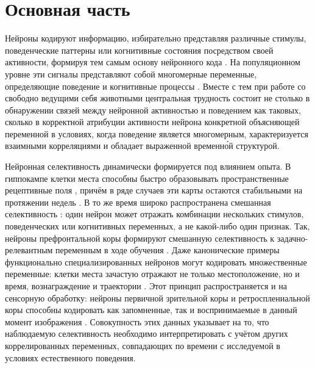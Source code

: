 \section{Основная часть}
\label{sec:main}

Нейроны кодируют информацию, избирательно представляя различные стимулы, поведенческие паттерны или когнитивные состояния посредством своей активности, формируя тем самым основу нейронного кода \cite{DayanAbbott2001}. На популяционном уровне эти сигналы представляют собой многомерные переменные, определяющие поведение и когнитивные процессы \cite{Averbeck2006}. Вместе с тем при работе со свободно ведущими себя животными центральная трудность состоит не столько в обнаружении связей между нейронной активностью и поведением как таковых, сколько в корректной атрибуции активности нейрона конкретной объясняющей переменной в условиях, когда поведение является многомерным, характеризуется взаимными корреляциями и обладает выраженной временн\'{о}й структурой.

Нейронная селективность динамически формируется под влиянием опыта. В гиппокампе клетки места способны быстро образовывать пространственные рецептивные поля \cite{Sotskov2022}, причём в ряде случаев эти карты остаются стабильными на протяжении недель \cite{Wilson1993, Thompson1990}. В то же время широко распространена смешанная селективность \cite{TyeMiller2024}: один нейрон может отражать комбинации нескольких стимулов, поведенческих или когнитивных переменных, а не какой-либо один признак. Так, нейроны префронтальной коры формируют смешанную селективность к задачно-релевантным переменным в ходе обучения \cite{mix3, Mante2013}. Даже канонические примеры функционально специализированных нейронов могут кодировать множественные переменные: клетки места зачастую отражают не только местоположение, но и время, вознаграждение и траектории \cite{Zheng2021, Lian2022}. Этот принцип распространяется и на сенсорную обработку: нейроны первичной зрительной коры и ретросплениальной коры способны кодировать как запомненные, так и воспринимаемые в данный момент изображения \cite{Makino2015}. Совокупность этих данных указывает на то, что наблюдаемую селективность необходимо интерпретировать с учётом других коррелированных переменных, совпадающих по времени с исследуемой в условиях естественного поведения.

